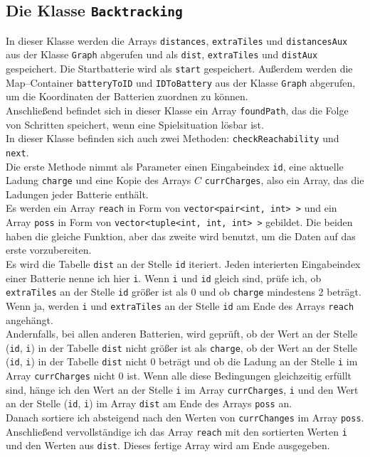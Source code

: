 \documentclass[a4paper,10pt,ngerman]{scrartcl}
\begin{document}
\subsection{Die Klasse \texttt{Backtracking}}
In dieser Klasse werden die Arrays \texttt{distances}, \texttt{extraTiles} und \texttt{distancesAux}
aus der Klasse \texttt{Graph} abgerufen und als \texttt{dist}, \texttt{extraTiles} und \texttt{distAux} gespeichert.
Die Startbatterie wird als \texttt{start} gespeichert. Außerdem werden die Map--Container \texttt{batteryToID}
und \texttt{IDToBattery} aus der Klasse \texttt{Graph} abgerufen, um die Koordinaten der Batterien zuordnen zu können.\\
Anschließend befindet sich in dieser Klasse ein Array \texttt{foundPath}, das die Folge von Schritten speichert,
wenn eine Spielsituation lösbar ist.\\
In dieser Klasse befinden sich auch zwei Methoden: \texttt{checkReachability} und \texttt{next}.\\

Die erste Methode nimmt als Parameter einen Eingabeindex \texttt{id}, eine aktuelle Ladung \texttt{charge}
und eine Kopie des Arrays $C$ \texttt{currCharges}, also ein Array, das die Ladungen jeder Batterie enthält.\\
Es werden ein Array \texttt{reach} in Form von \texttt{vector<pair<int, int> >} und ein Array \texttt{poss} in
Form von \texttt{vector<tuple<int, int, int> >} gebildet. Die beiden haben die gleiche Funktion, aber 
das zweite wird benutzt, um die Daten auf das erste vorzubereiten.\\
Es wird die Tabelle \texttt{dist} an der Stelle \texttt{id} iteriert. Jeden interierten Eingabeindex
einer Batterie nenne ich hier \texttt{i}.
Wenn \texttt{i} und \texttt{id} gleich sind, prüfe ich, ob \texttt{extraTiles} an der Stelle \texttt{id}
größer ist als 0 und ob \texttt{charge} mindestens 2 beträgt. Wenn ja, werden \texttt{i} und \texttt{extraTiles}
an der Stelle \texttt{id} am Ende des Arrays \texttt{reach} angehängt.\\
Andernfalls, bei allen anderen Batterien, wird geprüft, ob der Wert an der Stelle (\texttt{id}, \texttt{i}) in der Tabelle
\texttt{dist} nicht größer ist als \texttt{charge}, ob der Wert an der Stelle (\texttt{id}, \texttt{i}) in der Tabelle
\texttt{dist} nicht 0 beträgt und ob die Ladung an der Stelle \texttt{i} im Array \texttt{currCharges} nicht 0 ist.
Wenn alle diese Bedingungen gleichzeitig erfüllt sind, hänge ich den Wert an der Stelle \texttt{i} im Array \texttt{currCharges},
\texttt{i} und den Wert an der Stelle (\texttt{id}, \texttt{i}) im Array \texttt{dist} am Ende des Arrays \texttt{poss} an.\\
Danach sortiere ich absteigend nach den Werten von \texttt{currChanges} im Array \texttt{poss}. 
Anschließend vervollständige ich das Array \texttt{reach} mit den sortierten Werten \texttt{i} und den Werten aus \texttt{dist}.
Dieses fertige Array wird am Ende ausgegeben.\\
\end{document}
